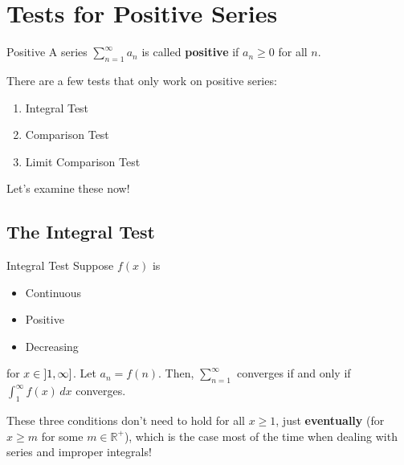 \setcounter{section}{4}
\section{Tests for Positive Series}
\begin{Definition}{Positive}{}
    A series $ \sum\limits_{n=1}^{\infty} a_n $ is called \textbf{positive}
    if $ a_n\geqslant 0 $ for all $ n $.
\end{Definition}
There are a few tests that only work on positive series:
\begin{enumerate}
    \item Integral Test
    \item Comparison Test
    \item Limit Comparison Test
\end{enumerate}
Let's examine these now!
\subsection{The Integral Test}
\begin{Theorem}{Integral Test}{}
    Suppose $ f(x) $ is
    \begin{itemize}
        \item Continuous
        \item Positive
        \item Decreasing
    \end{itemize}
    for $ x\in\interval[open left]{1}{\infty} $. Let $ a_n=f(n) $. Then,
    $ \sum\limits_{n=1}^{\infty}  $ converges if and only if $ \int_{1}^{\infty} f(x)\, d{x} $
    converges.
\end{Theorem}
\begin{Remark}{}{}
    These three conditions don't need to hold for all $ x\geqslant 1 $, just
    \textbf{eventually} (for $ x\geqslant m $ for some $ m\in\mathbb{R}^+ $),
    which is the case most of the time when dealing with series and improper integrals!
\end{Remark}
